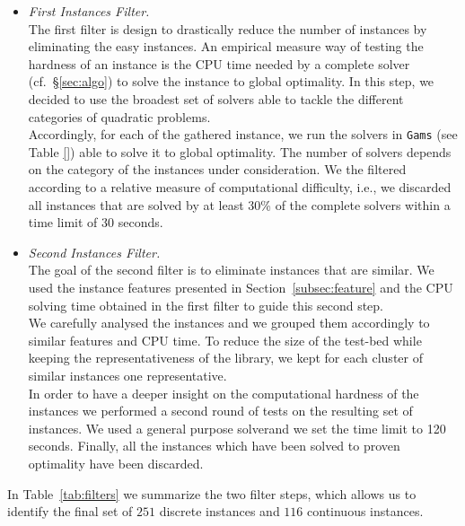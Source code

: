 \begin{itemize}
\item \emph{First Instances Filter.}\\
The first filter is design to drastically reduce the number of
instances by eliminating the easy instances. An empirical measure way
of testing the hardness of an instance is the CPU time needed by a
complete solver (cf.~\S \ref{sec:algo}) to solve the instance to
global optimality.
In this step, we decided to use the broadest set of solvers able to
tackle the different categories of quadratic problems.\\
Accordingly, for each of the gathered instance, we run the solvers in
{\tt Gams} (see Table \ref{}) able to solve it to global optimality.
The number of solvers depends on the category of the instances under
consideration.
We the filtered according to a relative measure of computational
difficulty, i.e., we discarded all instances that are solved by at
least 30\% of the complete solvers within a time limit of 30 seconds.
\item \emph{Second Instances Filter.}\\
The goal of the second filter is to eliminate instances that are similar.
We used the instance features presented in
Section~\ref{subsec:feature} and the CPU solving time obtained in the
first filter to guide this second step. \\
We carefully analysed the instances and we grouped them accordingly to
similar features and CPU time. To reduce the size of the test-bed
while keeping the representativeness of the library,     we kept for
each cluster of similar instances one representative.\\
In order to have a deeper insight on the computational hardness of the
instances we performed a second round of tests on the resulting set of
instances.  We used a general purpose solverand we set the time limit
to 120 seconds. Finally, all the instances which have been solved to
proven optimality have been discarded.
\end{itemize}
In Table~\ref{tab:filters} we summarize the two filter steps, which
allows us to identify the final set of $251$ discrete instances and
$116$ continuous instances.








